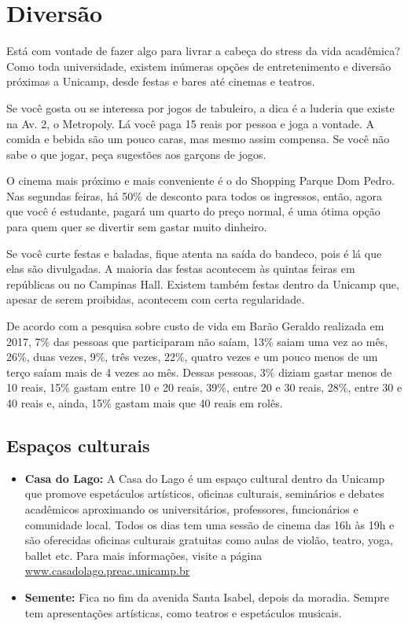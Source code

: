 
\section{Diversão}

Está com vontade de fazer algo para livrar a cabeça do stress da vida
acadêmica? Como toda universidade, existem inúmeras opções de entretenimento e
diversão próximas a Unicamp, desde festas e bares até cinemas e teatros.

Se você gosta ou se interessa por jogos de tabuleiro, a dica é a luderia que
existe na Av. 2, o Metropoly. Lá você paga 15 reais por pessoa e joga a
vontade. A comida e bebida são um pouco caras, mas mesmo assim compensa. Se
você não sabe o que jogar, peça sugestões aos garçons de jogos.

O cinema mais próximo e mais conveniente é o do Shopping Parque Dom Pedro. Nas
segundas feiras, há 50\% de desconto para todos os ingressos, então, agora que
você é estudante, pagará um quarto do preço normal, é uma ótima opção para quem
quer se divertir sem gastar muito dinheiro.

Se você curte festas e baladas, fique atenta na saída do bandeco, pois é lá que
elas são divulgadas. A maioria das festas acontecem às quintas feiras em
repúblicas ou no Campinas Hall. Existem também festas dentro da Unicamp que,
apesar de serem proibidas, acontecem com certa regularidade.

De acordo com a pesquisa sobre custo de vida em Barão Geraldo realizada em
2017, 7\% das pessoas que participaram não saíam, 13\% saiam uma vez ao mês,
26\%, duas vezes, 9\%, três vezes, 22\%, quatro vezes e um pouco menos de um
terço saíam mais de 4 vezes ao mês. Dessas pessoas, 3\% diziam gastar menos de
10 reais, 15\% gastam entre 10 e 20 reais, 39\%, entre 20 e 30 reais, 28\%,
entre 30 e 40 reais e, ainda, 15\% gastam mais que 40 reais em rolês.

\subsection{Espaços culturais}

\begin{itemize}
\item \textbf{Casa do Lago:} A Casa do Lago é um espaço cultural dentro da
  Unicamp que promove espetáculos artísticos, oficinas culturais, seminários e
  debates acadêmicos aproximando os universitários, professores, funcionários e
  comunidade local. Todos os dias tem uma sessão de cinema das 16h às 19h e são
  oferecidas oficinas culturais gratuitas como aulas de violão, teatro, yoga,
  ballet etc. Para mais informações, visite a página
  \url{www.casadolago.preac.unicamp.br}

\item \textbf{Semente:} Fica no fim da avenida Santa Isabel, depois da moradia.
  Sempre tem apresentações artísticas, como teatros e espetáculos musicais.
\end{itemize}

